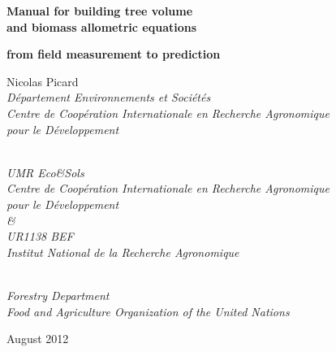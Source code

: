 

\newpage
\thispagestyle{empty}
\mbox{}
\newpage
\setcounter{page}{1}

\thispagestyle{empty}\mbox{}\vskip3cm%
\begin{center}
{\LARGE\bf Manual for building tree volume \\ and biomass allometric equations}
\par{\large\bf from field measurement to prediction}
\par\vskip3cm{\large Nicolas Picard}\\\textit{Département Environnements et Sociétés\\
Centre de Coopération Internationale en Recherche Agronomique\\
pour le Développement}
\par{}\\\textit{UMR Eco\&Sols\\
Centre de Coopération Internationale en Recherche Agronomique\\
pour le Développement\\\&\\ UR1138 BEF\\ Institut National de la
Recherche Agronomique}
\par{}\\\textit{Forestry Department\\
Food and Agriculture Organization of the United Nations}

\vskip3cm August 2012
\end{center}


\pagebreak\thispagestyle{empty}\mbox{}\vfill

